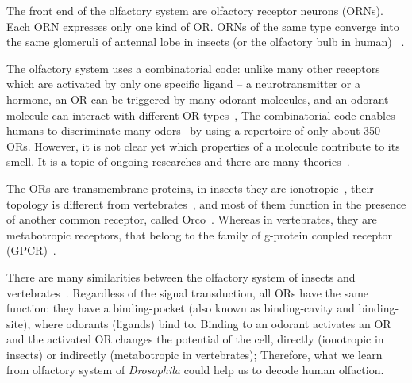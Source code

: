 \documentclass[11pt]{paper} %
\begin{document}
The front end of the olfactory system are olfactory receptor neurons (ORNs).  
Each ORN expresses only one kind of OR. 
ORNs of the same type converge into the same glomeruli of antennal lobe in insects (or the olfactory bulb in human)
~\cite{root2007,Carey2011,Vosshall2000,Couto2005,fishilevich2005,gao2000,wang1998,mombaerts1996,vassar1994}.

The olfactory system uses a combinatorial code: 
unlike many other receptors which are activated by only one specific ligand -- a neurotransmitter or a hormone,
an OR can be triggered by many odorant molecules, 
and an odorant molecule can interact with different OR types~\cite{Malnic2000},
The combinatorial code enables humans to discriminate many odors~\cite{Bushdid2014} by using a repertoire of only about 350 ORs.
However, it is not clear yet which properties of a molecule contribute to its smell. 
It is a topic of ongoing researches and there are many theories~\cite{Turin,Keller2004,Araneda2000,Brookes2007,Franco2011,Pelz2006,Gabler2013,Schmuker2007,Haddad2008,Snitz2013,Yablonka2012,gane2013,
turin2015plausibility,block2015implausibility,vosshall2015laying}.

The ORs are transmembrane proteins, 
in insects they are ionotropic~\cite{Sato2008,Wicher2008,Nagel2011,Rong2011}, 
their topology is different from vertebrates~\cite{Benton2006,Smart2008},
and most of them function in the presence of another common receptor, called Orco~\cite{Larsson2004}.
Whereas in vertebrates, they are metabotropic receptors, that belong to the family of g-protein coupled receptor (GPCR)~\cite{Buck1991,niimura2009evolutionary}. 

There are many similarities between the olfactory system of insects and vertebrates~\cite{Wilson2014,Kaupp2010}.
Regardless of the signal transduction, 
all ORs have the same function: they have a binding-pocket (also known as binding-cavity and binding-site),
where odorants (ligands) bind to. 
Binding to an odorant activates an OR and 
the activated OR changes the potential of the cell, 
directly (ionotropic in insects) or indirectly (metabotropic in vertebrates);
Therefore, what we learn from olfactory system of \textit{Drosophila} could help us to decode human olfaction. 
\end{document}
